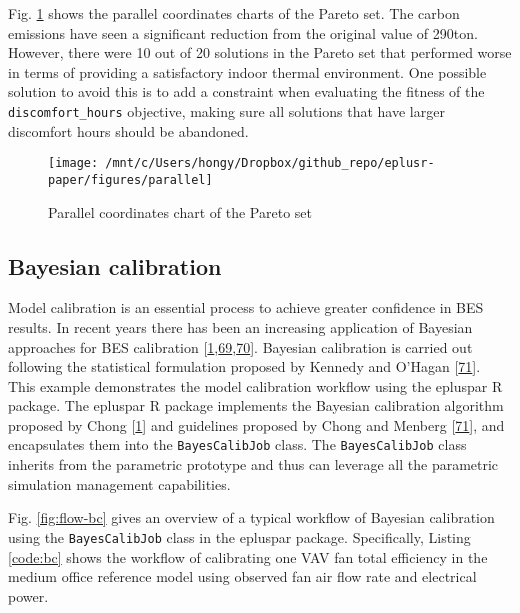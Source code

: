\documentclass[3p, times]{elsarticle} %
\begin{document}
Fig. \ref{fig:parallel} shows the parallel coordinates charts of the Pareto
set. The carbon emissions have seen a significant reduction from the original
value of 290ton. However, there were 10 out of 20 solutions in the Pareto set
that performed worse in terms of providing a satisfactory indoor thermal
environment. One possible solution to avoid this is to add a constraint when
evaluating the fitness of the \texttt{discomfort\_hours} objective, making sure all
solutions that have larger discomfort hours should be abandoned.

\begin{figure}[!htb]
\texttt{[image: /mnt/c/Users/hongy/Dropbox/github\_repo/eplusr-paper/figures/parallel]} \caption{Parallel coordinates chart of the Pareto set}\label{fig:parallel}
\end{figure}

\hypertarget{bayesian-calibration}{%
\subsection{Bayesian calibration}\label{bayesian-calibration}}

Model calibration is an essential process to achieve greater confidence in BES
results. In recent years there has been an increasing application of Bayesian
approaches for BES calibration {[}\protect\hyperlink{ref-Chong2017}{1},\protect\hyperlink{ref-Tian2016Identifying}{69},\protect\hyperlink{ref-Yi2019Parameter}{70}{]}. Bayesian calibration is carried out following the statistical
formulation proposed by Kennedy and O'Hagan {[}\protect\hyperlink{ref-Chong2018}{71}{]}. This example
demonstrates the model calibration workflow using the epluspar R package. The
epluspar R package implements the Bayesian calibration algorithm proposed by
Chong {[}\protect\hyperlink{ref-Chong2017}{1}{]} and guidelines proposed by Chong and Menberg {[}\protect\hyperlink{ref-Chong2018}{71}{]},
and encapsulates them into the \texttt{BayesCalibJob} class. The \texttt{BayesCalibJob} class
inherits from the parametric prototype and thus can leverage all the parametric
simulation management capabilities.

Fig. \ref{fig:flow-bc} gives an overview of a typical workflow of Bayesian
calibration using the \texttt{BayesCalibJob} class in the epluspar package.
Specifically, Listing \ref{code:bc} shows the workflow of calibrating one VAV
fan total efficiency in the medium office reference model using observed fan air
flow rate and electrical power.
\end{document}
